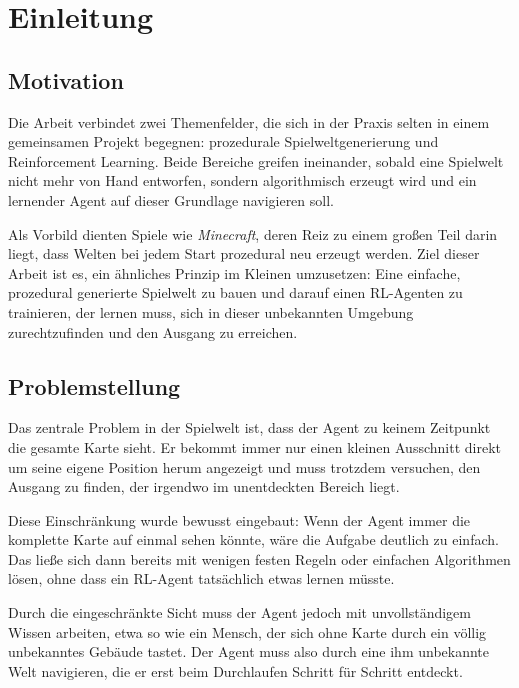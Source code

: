 \documentclass[
  a4paper,
  11pt,
  twoside,
  BCOR=8mm,           %
  headings=big,
  numbers=noenddot,
  listof=totoc,       %
  captions=tableheading,
]{scrreprt}
\begin{document}
\chapter{Einleitung}
\label{chap:einleitung}

\section{Motivation}
\label{sec:motivation}

Die Arbeit verbindet zwei Themenfelder, die sich in der Praxis selten in einem gemeinsamen Projekt begegnen: prozedurale Spielweltgenerierung und Reinforcement Learning. Beide Bereiche greifen ineinander, sobald eine Spielwelt nicht mehr von Hand entworfen, sondern algorithmisch erzeugt wird und ein lernender Agent auf dieser Grundlage navigieren soll.

Als Vorbild dienten Spiele wie \textit{Minecraft}, deren Reiz zu einem großen Teil darin liegt, dass Welten bei jedem Start prozedural neu erzeugt werden. Ziel dieser Arbeit ist es, ein ähnliches Prinzip im Kleinen umzusetzen: Eine einfache, prozedural generierte Spielwelt zu bauen und darauf einen RL-Agenten zu trainieren, der lernen muss, sich in dieser unbekannten Umgebung zurechtzufinden und den Ausgang zu erreichen.

\section{Problemstellung}
\label{sec:problemstellung}

Das zentrale Problem in der Spielwelt ist, dass der Agent zu keinem Zeitpunkt die gesamte Karte sieht. Er bekommt immer nur einen kleinen Ausschnitt direkt um seine eigene Position herum angezeigt und muss trotzdem versuchen, den Ausgang zu finden, der irgendwo im unentdeckten Bereich liegt.

Diese Einschränkung wurde bewusst eingebaut: Wenn der Agent immer die komplette Karte auf einmal sehen könnte, wäre die Aufgabe deutlich zu einfach. Das ließe sich dann bereits mit wenigen festen Regeln oder einfachen Algorithmen lösen, ohne dass ein RL-Agent tatsächlich etwas lernen müsste.

Durch die eingeschränkte Sicht muss der Agent jedoch mit unvollständigem Wissen arbeiten, etwa so wie ein Mensch, der sich ohne Karte durch ein völlig unbekanntes Gebäude tastet. Der Agent muss also durch eine ihm unbekannte Welt navigieren, die er erst beim Durchlaufen Schritt für Schritt entdeckt.
\end{document}
